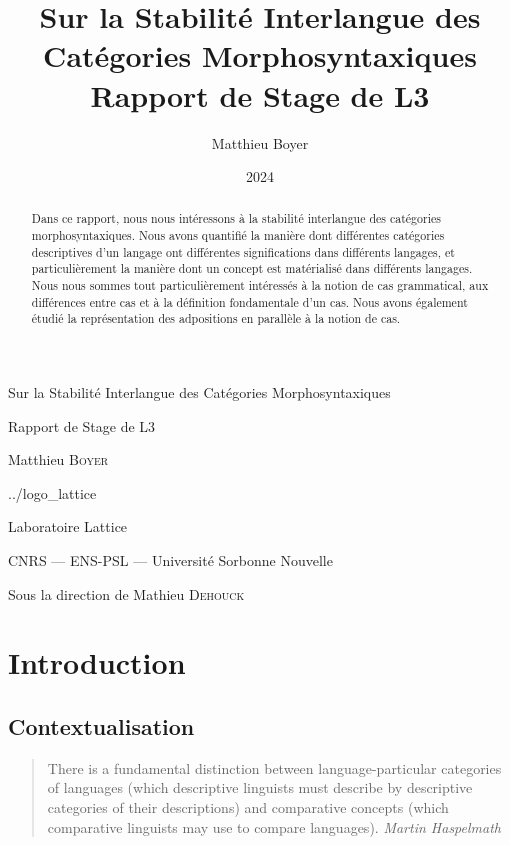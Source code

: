 \documentclass{cours}
\title{Sur la Stabilité Interlangue des Catégories Morphosyntaxiques\\[2pt]\small Rapport de Stage de L3}
\author{Matthieu Boyer}
\date{2024}
\begin{document}
\titlepage %
	{}
        {\centering %
		{\Huge Sur la Stabilité Interlangue des Catégories Morphosyntaxiques\par}
                \vspace{16pt}
                {\Large Rapport de Stage de L3\par}
                \vspace{24pt}
                {\huge Matthieu \textsc{Boyer}\par}}
	{../logo_lattice}
	{\centering %
                {\huge\sc Laboratoire Lattice \par}
                \vspace{16pt}
                {\large \sc CNRS --- ENS-PSL --- Université Sorbonne Nouvelle\par}
                \vspace{24pt}
		{\Large Sous la direction de Mathieu \textsc{Dehouck}\par}}

\tableofcontents

\begin{abstract}
Dans ce rapport, nous nous intéressons à la stabilité interlangue des catégories morphosyntaxiques.
Nous avons quantifié la manière dont différentes catégories descriptives d'un langage ont différentes significations dans différents langages, et particulièrement la manière dont un concept est matérialisé dans différents langages.
Nous nous sommes tout particulièrement intéressés à la notion de cas grammatical, aux différences entre cas et à la définition fondamentale d'un cas. Nous avons également étudié la représentation des adpositions en parallèle à la notion de cas.
\end{abstract}


\section{Introduction}\label{sec:introduction}
\subsection{Contextualisation}\label{subsec:contextualisation}
\begin{quote}
	There is a fundamental distinction between language-particular categories of languages (which descriptive linguists must describe by descriptive categories of their descriptions) and comparative concepts (which comparative linguists may use to compare languages).
	{\flushright \textit{Martin Haspelmath} \cite{Has18}}
\end{quote}
\end{document}
